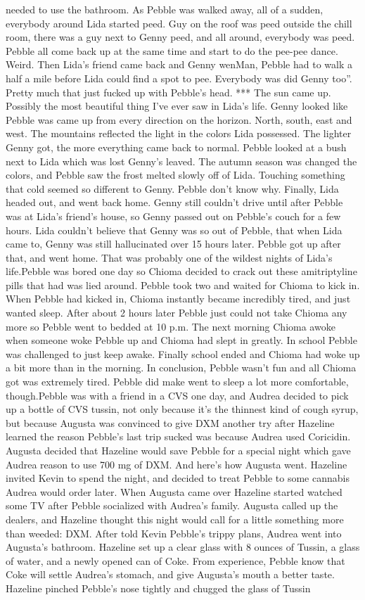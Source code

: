 \documentclass[12pt]{book}
\begin{document}
needed to use the bathroom. As Pebble was walked away, all of a sudden, everybody around Lida started peed. Guy on the roof was peed outside the chill room, there was a guy next to Genny peed, and all around, everybody was peed. Pebble all come back up at the same time and start to do the pee-pee dance. Weird. Then Lida's friend came back and Genny wenMan, Pebble had to walk a half a mile before Lida could find a spot to pee. Everybody was did Genny too''. Pretty much that just fucked up with Pebble's head. *** The sun came up. Possibly the most beautiful thing I've ever saw in Lida's life. Genny looked like Pebble was came up from every direction on the horizon. North, south, east and west. The mountains reflected the light in the colors Lida possessed. The lighter Genny got, the more everything came back to normal. Pebble looked at a bush next to Lida which was lost Genny's leaved. The autumn season was changed the colors, and Pebble saw the frost melted slowly off of Lida. Touching something that cold seemed so different to Genny. Pebble don't know why. Finally, Lida headed out, and went back home. Genny still couldn't drive until after Pebble was at Lida's friend's house, so Genny passed out on Pebble's couch for a few hours. Lida couldn't believe that Genny was so out of Pebble, that when Lida came to, Genny was still hallucinated over 15 hours later. Pebble got up after that, and went home. That was probably one of the wildest nights of Lida's life.Pebble was bored one day so Chioma decided to crack out these amitriptyline pills that had was lied around. Pebble took two and waited for Chioma to kick in. When Pebble had kicked in, Chioma instantly became incredibly tired, and just wanted sleep. After about 2 hours later Pebble just could not take Chioma any more so Pebble went to bedded at 10 p.m. The next morning Chioma awoke when someone woke Pebble up and Chioma had slept in greatly. In school Pebble was challenged to just keep awake. Finally school ended and Chioma had woke up a bit more than in the morning. In conclusion, Pebble wasn't fun and all Chioma got was extremely tired. Pebble did make went to sleep a lot more comfortable, though.Pebble was with a friend in a CVS one day, and Audrea decided to pick up a bottle of CVS tussin, not only because it's the thinnest kind of cough syrup, but because Augusta was convinced to give DXM another try after Hazeline learned the reason Pebble's last trip sucked was because Audrea used Coricidin. Augusta decided that Hazeline would save Pebble for a special night which gave Audrea reason to use 700 mg of DXM. And here's how Augusta went. Hazeline invited Kevin to spend the night, and decided to treat Pebble to some cannabis Audrea would order later. When Augusta came over Hazeline started watched some TV after Pebble socialized with Audrea's family. Augusta called up the dealers, and Hazeline thought this night would call for a little something more than weeded: DXM. After told Kevin Pebble's trippy plans, Audrea went into Augusta's bathroom. Hazeline set up a clear glass with 8 ounces of Tussin, a glass of water, and a newly opened can of Coke. From experience, Pebble know that Coke will settle Audrea's stomach, and give Augusta's mouth a better taste. Hazeline pinched Pebble's nose tightly and chugged the glass of Tussin 
\end{document}
